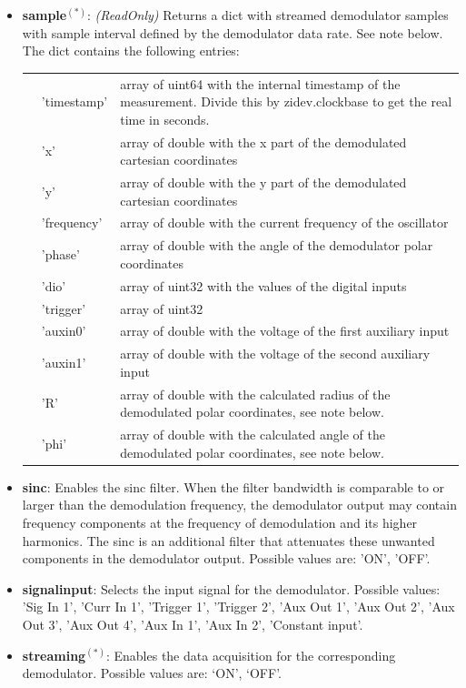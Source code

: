 \documentclass[11pt]{article} %
\begin{document}
\begin{itemize}
	\item {\bf sample}$^{(*)}$: {\it (ReadOnly)} Returns a dict with streamed demodulator samples with sample interval defined by the demodulator data rate. See note below. The dict contains the following entries:
	\begin{longtable}{p{1.5cm}p{3cm}p{12cm}}
	& 'timestamp' & array of uint64 with the internal timestamp of the measurement. Divide this by zidev.clockbase to get the real time in seconds. \\
	& 'x' & array of double with the x part of the demodulated cartesian coordinates \\
	& 'y' & array of double with the y part of the demodulated cartesian coordinates \\
	& 'frequency' & array of double with the current frequency of the oscillator \\
	& 'phase' & array of double with the angle of the demodulator polar coordinates \\
	& 'dio' & array of uint32 with the values of the digital inputs \\
	& 'trigger' & array of uint32 \\
	& 'auxin0' & array of double with the voltage of the first auxiliary input \\
	& 'auxin1' & array of double with the voltage of the second auxiliary input \\
	& 'R' & array of double with the calculated radius of the demodulated polar coordinates, see note below. \\
	& 'phi' & array of double with the calculated angle of the demodulated polar coordinates, see note below. \\
	\end{longtable}
	\item {\bf sinc}: Enables the sinc filter. When the filter bandwidth is comparable to or larger than the demodulation frequency, the demodulator output may contain frequency components at the frequency of demodulation and its higher harmonics. The sinc is an additional filter that attenuates these unwanted components in the demodulator output. Possible values are: 'ON', 'OFF'.
	\item {\bf signalinput}: Selects the input signal for the demodulator. Possible values: 'Sig In 1', 'Curr In 1', 'Trigger 1', 'Trigger 2', 'Aux Out 1', 'Aux Out 2', 'Aux Out 3', 'Aux Out 4', 'Aux In 1', 'Aux In 2', 'Constant input'.
	\item {\bf streaming}$^{(*)}$: Enables the data acquisition for the corresponding demodulator. Possible values are: `ON', `OFF'.

\end{itemize}
\end{document}

